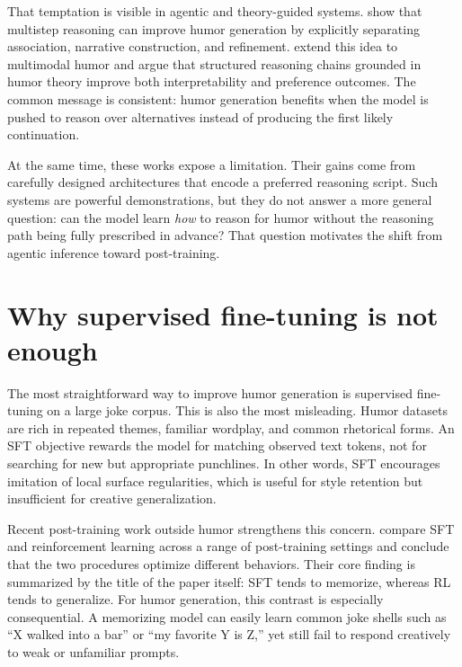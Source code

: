 \documentclass[14pt,a4paper]{extreport}
\begin{document}
That temptation is visible in agentic and theory-guided systems. \citet{Tikhonov2024} show that multistep reasoning can improve humor generation by explicitly separating association, narrative construction, and refinement. \citet{ZhangJ2025} extend this idea to multimodal humor and argue that structured reasoning chains grounded in humor theory improve both interpretability and preference outcomes. The common message is consistent: humor generation benefits when the model is pushed to reason over alternatives instead of producing the first likely continuation.

At the same time, these works expose a limitation. Their gains come from carefully designed architectures that encode a preferred reasoning script. Such systems are powerful demonstrations, but they do not answer a more general question: can the model learn \emph{how} to reason for humor without the reasoning path being fully prescribed in advance? That question motivates the shift from agentic inference toward post-training.


\section{Why supervised fine-tuning is not enough}

The most straightforward way to improve humor generation is supervised fine-tuning on a large joke corpus. This is also the most misleading. Humor datasets are rich in repeated themes, familiar wordplay, and common rhetorical forms. An SFT objective rewards the model for matching observed text tokens, not for searching for new but appropriate punchlines. In other words, SFT encourages imitation of local surface regularities, which is useful for style retention but insufficient for creative generalization.

Recent post-training work outside humor strengthens this concern. \citet{Chu2025} compare SFT and reinforcement learning across a range of post-training settings and conclude that the two procedures optimize different behaviors. Their core finding is summarized by the title of the paper itself: SFT tends to memorize, whereas RL tends to generalize. For humor generation, this contrast is especially consequential. A memorizing model can easily learn common joke shells such as ``X walked into a bar'' or ``my favorite Y is Z,'' yet still fail to respond creatively to weak or unfamiliar prompts.
\end{document}
